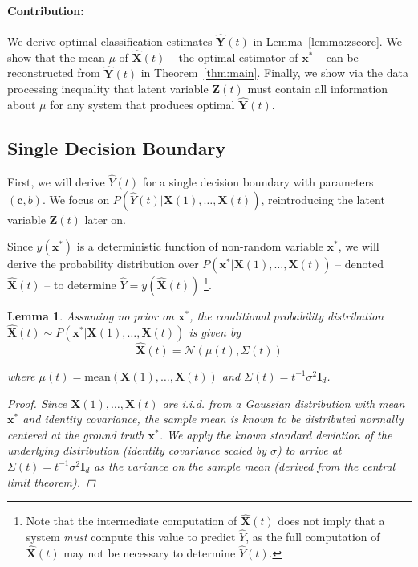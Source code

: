 \documentclass[12pt]{article}
\newtheorem{lemma}{Lemma}
\begin{document}
\paragraph{Contribution: } We derive optimal classification estimates $\hat{\mathbf Y}(t)$ in Lemma~\ref{lemma:zscore}. We show that the mean $\mu$ of $\hat{\mathbf X}(t)$ -- the optimal estimator of $\mathbf x^*$ -- can be reconstructed from $\hat{\mathbf Y}(t)$ in Theorem~\ref{thm:main}. Finally, we show via the data processing inequality that latent variable $\mathbf Z(t)$ must contain all information about $\mu$ for any system that produces optimal $\hat{\mathbf Y}(t)$. 








\subsection{Single Decision Boundary}
\label{sec:single_boundary}

First, we will derive $\hat Y(t)$ for a single decision boundary with parameters $(\mathbf c, b)$. 
We focus on $P(\hat Y(t) | \mathbf X(1), \dots, \mathbf X(t))$, reintroducing the latent variable $\mathbf Z(t)$ later on. 

Since $y(\mathbf x^*)$ is a deterministic function of non-random variable $\mathbf x^*$, we will derive the probability distribution over $P(\mathbf x^* | \mathbf X(1), \dots, \mathbf X(t))$ -- denoted $\hat{\mathbf X}(t)$ -- to determine $\hat Y = y(\hat{\mathbf X}(t))$
\footnote{Note that the intermediate computation of $\hat{\mathbf X}(t)$ does not imply that a system \textit{must} compute this value to predict $\hat Y$, as the full computation of $\hat{\mathbf X}(t)$ may not be necessary to determine $\hat Y(t)$.}.


\begin{lemma}
    \label{lemma:x_star_estimate}
	Assuming no prior on $\mathbf x^*$, the conditional probability distribution $\hat{\mathbf X}(t) \sim P(\mathbf x^* | \mathbf X(1), \dots, \mathbf X(t))$ is given by 
	\begin{equation}
		\hat{\mathbf X}(t) = \mathcal N(\mu(t), \Sigma(t))
        \label{eqn:estimator}
	\end{equation}

	where $\mu(t)= \text{mean}(\mathbf X(1), \dots, \mathbf X(t))$ and $\Sigma(t) = t^{-1} \sigma^2 \mathbf I_d$. 

	\begin{proof}
		Since $\mathbf X(1), \dots, \mathbf X(t)$ are i.i.d. from a Gaussian distribution with mean $\mathbf x^*$ and identity covariance, the sample mean is known to be distributed normally centered at the ground truth $\mathbf x^*$. 
		We apply the known standard deviation of the underlying distribution (identity covariance scaled by $\sigma$) to arrive at $\Sigma(t) = t^{-1} \sigma^2 \mathbf I_d$ as the variance on the sample mean (derived from the central limit theorem). 
	\end{proof}
\end{lemma}
\end{document}
